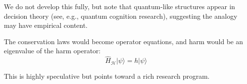 \documentclass[12pt,letterpaper]{article}
\theoremstyle{definition}
\theoremstyle{remark}
\newcommand{\harm}{\mathcal{H}}
\begin{document}
We do not develop this fully, but note that quantum-like structures appear in decision theory (see, e.g., quantum cognition research), suggesting the analogy may have empirical content.

The conservation laws would become operator equations, and harm would be an eigenvalue of the harm operator:
\begin{equation}
\hat{H}_\harm |\psi\rangle = h |\psi\rangle
\end{equation}

This is highly speculative but points toward a rich research program.
\end{document}
